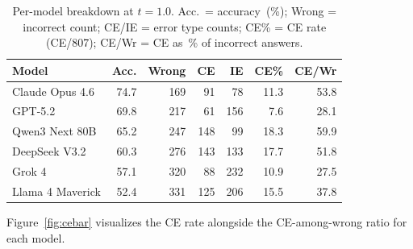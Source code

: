 \documentclass[12pt,twocolumn]{article}
\begin{document}
\begin{table}[H]
\centering
\scriptsize
\setlength{\tabcolsep}{3pt}
\begin{tabular}{@{}lrrrrrr@{}}
\toprule
Model & Acc. & Wrong & CE & IE & CE\% & CE/Wr \\
\midrule
Claude Opus 4.6   & 74.7 & 169 &  91 &  78 & 11.3 & 53.8 \\
GPT-5.2           & 69.8 & 217 &  61 & 156 &  7.6 & 28.1 \\
Qwen3 Next 80B    & 65.2 & 247 & 148 &  99 & 18.3 & 59.9 \\
DeepSeek V3.2     & 60.3 & 276 & 143 & 133 & 17.7 & 51.8 \\
Grok 4            & 57.1 & 320 &  88 & 232 & 10.9 & 27.5 \\
Llama 4 Maverick  & 52.4 & 331 & 125 & 206 & 15.5 & 37.8 \\
\bottomrule
\end{tabular}
\caption{Per-model breakdown at $t{=}1.0$. Acc.\ = accuracy~(\%);
Wrong = incorrect count; CE/IE = error type counts; CE\% = CE rate
(CE/807); CE/Wr = CE as~\% of incorrect answers.}
\label{tab:permodel}
\end{table}

Figure~\ref{fig:cebar} visualizes the CE rate alongside the
CE-among-wrong ratio for each model.
\end{document}
